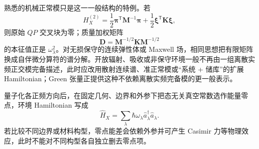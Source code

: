 熟悉的机械正常模只是这一一般结构的特例。若
\[
H_X^{(2)}
=
\frac12\boldsymbol\pi^{\mathsf T}\mathbf M^{-1}\boldsymbol\pi
+\frac12\boldsymbol\xi^{\mathsf T}\mathbf K\boldsymbol\xi,
\]
则原始 $QP$ 交叉块为零；质量加权矩阵
\[
\mathbf D
=
\mathbf M^{-1/2}\mathbf K\mathbf M^{-1/2}
\]
的本征值正是 $\omega_\lambda^2$。对无损保守的连续弹性体或 Maxwell 场，相同思想把有限矩阵换成自伴微分算符的谱分解。开放辐射、吸收或非保守环境一般不再由一组离散实频正交模完备描述，此时应改用散射连续谱、准正常模或“系统 + 储库”的扩展 Hamiltonian；Green 张量正提供这种不依赖离散实频完备模的更一般表示。

量子化各正频方向后，在固定几何、边界和外参下把态无关真空常数选作能量零点，环境 Hamiltonian 写成
\begin{equation}
\boxed{
\hat H_X
=\sum_\lambda\hbar\omega_\lambda
\hat a_\lambda^\dagger\hat a_\lambda .}
\label{eq:general_harmonic_environment_hamiltonian}
\end{equation}
若比较不同边界或材料构型，零点能差会依赖外参并可产生 Casimir 力等物理效应，此时不能对不同构型各自独立删去零点项。

